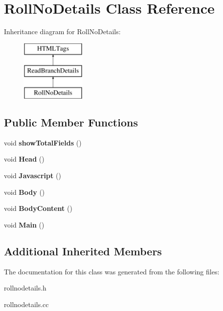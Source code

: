 \hypertarget{classRollNoDetails}{\section{Roll\-No\-Details Class Reference}
\label{classRollNoDetails}
}
Inheritance diagram for Roll\-No\-Details\-:\begin{figure}[H]
\begin{center}
\leavevmode
\includegraphics[height=3.000000cm]{classRollNoDetails}
\end{center}
\end{figure}
\subsection*{Public Member Functions}
\begin{DoxyCompactItemize}
\item 
\hypertarget{classRollNoDetails_a1a73466ff174536c74ac9bcace561c83}{void {\bfseries show\-Total\-Fields} ()}\label{classRollNoDetails_a1a73466ff174536c74ac9bcace561c83}

\item 
\hypertarget{classRollNoDetails_ad3fa3bfcba84e65264f12627095da3d6}{void {\bfseries Head} ()}\label{classRollNoDetails_ad3fa3bfcba84e65264f12627095da3d6}

\item 
\hypertarget{classRollNoDetails_a2f81605e7a0fc1305b0c568bf1d26b8c}{void {\bfseries Javascript} ()}\label{classRollNoDetails_a2f81605e7a0fc1305b0c568bf1d26b8c}

\item 
\hypertarget{classRollNoDetails_aeadbb26bf6e93895d69af83ec4bb40a0}{void {\bfseries Body} ()}\label{classRollNoDetails_aeadbb26bf6e93895d69af83ec4bb40a0}

\item 
\hypertarget{classRollNoDetails_a22c4dd142eebe3cfaf220b6080257082}{void {\bfseries Body\-Content} ()}\label{classRollNoDetails_a22c4dd142eebe3cfaf220b6080257082}

\item 
\hypertarget{classRollNoDetails_aef87b13056bb753c31e43021df9764c4}{void {\bfseries Main} ()}\label{classRollNoDetails_aef87b13056bb753c31e43021df9764c4}

\end{DoxyCompactItemize}
\subsection*{Additional Inherited Members}


The documentation for this class was generated from the following files\-:\begin{DoxyCompactItemize}
\item 
rollnodetails.\-h\item 
rollnodetails.\-cc\end{DoxyCompactItemize}
